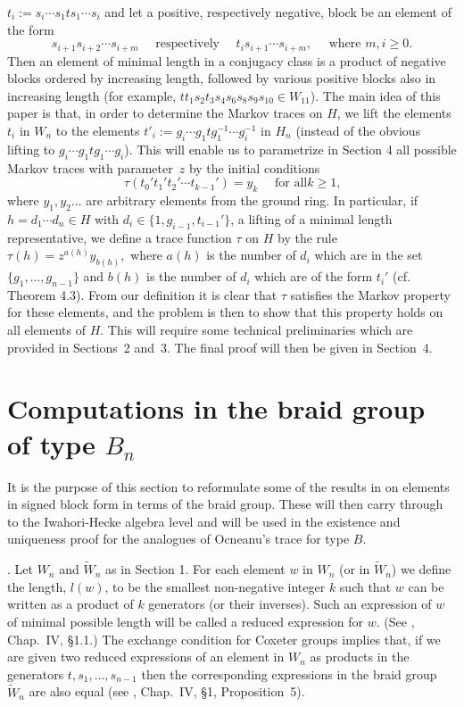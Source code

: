 $t_i:=s_i \cdots s_1t s_1 \cdots s_i$ and let a
positive, respectively  negative,  block be an element of the form
\[s_{i+1}s_{i+2}\cdots s_{i+m} \quad \mbox{ respectively } \quad
t_i s_{i+1} \cdots s_{i+m}, \quad \mbox{ where } m,i\geq 0.\]
Then an element of minimal length in a conjugacy class is a  product of negative
blocks ordered by increasing length, followed by various positive blocks also in 
increasing  length (for example, $t t_1s_2 t_3s_4 s_6 s_8s_9s_{10} \in W_{11}$). The
main idea of this paper is that, in order to determine the  
 Markov traces on  $H$, we lift the elements $t_i$ in $W_n$ to  the elements
$t'_i:=g_i \cdots g_1t g_1^{-1} \cdots g_i^{-1}$ in $H_n$ (instead of the obvious
lifting to $g_i \cdots g_1t g_1 \cdots g_i$). This will enable us to
parametrize in Section 4 all possible Markov traces with parameter~$z$  by the
initial conditions  \[ \tau(t_0't_1't_2' \cdots t_{k-1}')=y_k \quad \mbox{ for all
$k \geq 1$,}\] where $y_1,y_2 \ldots$ are arbitrary elements from the ground ring. In
particular, if $h=d_1 \cdots d_n \in H$ with $d_i \in \{1, g_{i-1}, t_{i-1}'
\}$, a lifting of a minimal length representative, we define a  trace function
$\tau$ on $H$ by the rule $ \tau(h)=z^{a(h)} y_{b(h)},$ where $a(h)$  is the 
 number of $d_i$ which are  in  the set $\{g_1,\ldots,g_{n-1}\}$ and $b(h)$ is the
number  of $d_i$ which are of the form $t_i'$ (cf. Theorem 4.3). From our definition 
it is clear that $\tau$ satisfies  the Markov property for  these
elements,  and the  problem is then to show that this  property holds on
all elements of $H$. This will require some technical preliminaries which  
are provided in Sections~2 and~3. The final proof will then be given in Section~4.


\section{Computations in the braid group of type $B_n$}

It is the purpose of  this section to reformulate  some of the results
in \cite{GP}  on elements in signed block  form in  terms of the braid
group. These will then carry through to the Iwahori-Hecke algebra level and will be
used in the  existence and  uniqueness proof for the  analogues of   Ocneanu's 
trace for type $B$.
 
. Let $W_n$ and $\tilde{W}_n$ as in Section 1. For  each element $w$ in $W_n$ (or
in $\tilde{W}_n$) we  define the length, $l(w)$, to be the smallest non-negative 
integer $k$ such that $w$  can   be  written as  a    product of $k$  generators  
(or their inverses).  Such an expression of  $w$ of minimal possible length will
be called  a reduced expression for  $w$. (See \cite{Bour}, Chap.\ IV,
\S 1.1.) The  exchange  condition for Coxeter  groups implies   that, if we are
given two  reduced expressions of an element  in $W_n$ as  products in
the generators    $t,s_1,\ldots,s_{n-1}$      then the   corresponding
expressions  in the braid  group   $\tilde{W}_n$ are also  equal  (see
\cite{Bour}, Chap.\ IV, \S 1, Proposition~5).

